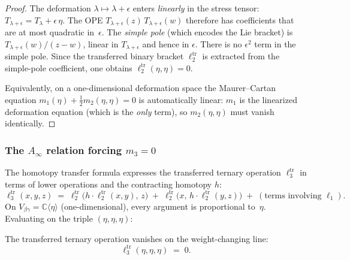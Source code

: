 \begin{proof}
The deformation $\lambda \mapsto \lambda + \epsilon$ enters
\emph{linearly} in the stress tensor: $T_{\lambda+\epsilon} =
T_\lambda + \epsilon\,\eta$. The OPE
$T_{\lambda+\epsilon}(z)\,T_{\lambda+\epsilon}(w)$ therefore
has coefficients that are at most quadratic in~$\epsilon$.
The \emph{simple pole} (which encodes the Lie bracket)
is $T_{\lambda+\epsilon}(w)/(z-w)$, linear in
$T_{\lambda+\epsilon}$ and hence in $\epsilon$. There is no
$\epsilon^2$ term in the simple pole. Since the transferred binary
bracket $\ell_2^{\mathrm{tr}}$ is extracted from the simple-pole
coefficient, one obtains $\ell_2^{\mathrm{tr}}(\eta,\eta) = 0$.

Equivalently, on a one-dimensional deformation space the
Maurer--Cartan equation
$m_1(\eta) + \tfrac{1}{2}m_2(\eta,\eta) = 0$ is automatically
linear: $m_1$ is the linearized deformation equation (which is the
\emph{only} term), so $m_2(\eta,\eta)$ must vanish identically.
\end{proof}

\subsubsection{The \texorpdfstring{$A_\infty$}{A-infinity} relation
forcing \texorpdfstring{$m_3 = 0$}{m3 = 0}}
\label{sssec:betagamma-m3-vanishing}

The homotopy transfer formula expresses the transferred ternary
operation $\ell_3^{\mathrm{tr}}$ in terms of lower operations and the
contracting homotopy $h$:
\begin{equation}\label{eq:betagamma-ell3-transfer}
 \ell_3^{\mathrm{tr}}(x,y,z)
 \;=\;
 \ell_2^{\mathrm{tr}}\bigl(h \cdot \ell_2^{\mathrm{tr}}(x,y),\, z\bigr)
 \;+\;
 \ell_2^{\mathrm{tr}}\bigl(x,\, h \cdot \ell_2^{\mathrm{tr}}(y,z)\bigr)
 \;+\; (\text{terms involving } \ell_1).
\end{equation}
On $V_{\beta\gamma} = \mathbb{C}\langle \eta \rangle$ (one-dimensional),
every argument is proportional to~$\eta$. Evaluating on the
triple $(\eta, \eta, \eta)$:

\begin{proposition}[$\ell_3^{\mathrm{tr}}(\eta,\eta,\eta) = 0$;
\ClaimStatusProvedHere]
\label{prop:betagamma-ell3-vanishing}
The transferred ternary operation vanishes on the weight-changing line:
\[
 \ell_3^{\mathrm{tr}}(\eta,\eta,\eta) \;=\; 0.
\]
\end{proposition}

